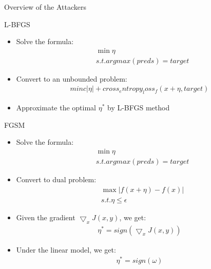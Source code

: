 \documentclass[
 size=12pt,
 paper=smartboard, %
 mode=present, %
 display=slides, %
style=tuliplab,
pauseslide,
fleqn,leqno]{powerdot}
\begin{document}
\begin{slide}[toc=,bm=]{Overview of the Attackers}
\tableofcontents[content=currentsection,type=0]
\end{slide}

\begin{slide}{L-BFGS\cite{RN143}}
  \begin{itemize}
    \item Solve the formula:
      \begin{equation}
        \begin{split}
        &\min {\eta} \\
        &s.t. argmax(preds) = target
        \end{split}
      \end{equation} \pause
    \item Convert to an unbounded problem: \pause
    \begin{equation}
      \begin{split}
      min{c\vert\eta\vert + cross_entropy_loss_f(x+\eta, target)}
      \end{split}
    \end{equation} 
    \item Approximate the optimal $\eta^*$ by L-BFGS method
  \end{itemize}
\end{slide}

\begin{slide}{FGSM\cite{RN48}}
  \begin{itemize}
    \item Solve the formula:
      \begin{equation}
        \begin{split}
        &\min {\eta} \\
        &s.t. argmax(preds) = target
        \end{split}
      \end{equation} \pause
    \item Convert to dual problem: \pause
      \begin{equation}
        \begin{split}
        &\max {\vert f(x+\eta)-f(x) \vert} \\
        &s.t. \eta \le \epsilon
        \end{split}
      \end{equation} \pause
    \item Given the gradient $\bigtriangledown_xJ(x, y)$, we get:
      \begin{equation}
        \begin{split}
          \eta^* = sign(\bigtriangledown_xJ(x, y))
        \end{split}
      \end{equation} \pause
    \item Under the linear model, we get:
    \begin{equation}
      \begin{split}
        \eta^* = sign(\omega)
      \end{split}
    \end{equation}
  \end{itemize}
\end{slide}
\end{document}
